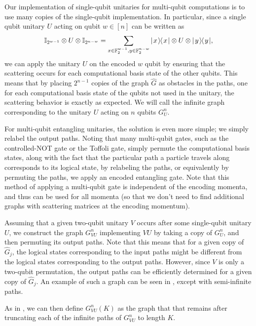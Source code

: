 \documentclass[../thesis-main/thesis-main]{subfiles}
\begin{document}
Our implementation of single-qubit unitaries for multi-qubit computations is to use many copies of the single-qubit implementation.  In particular, since a single qubit unitary $U$ acting on qubit $w\in [n]$ can be written as
\begin{align}
  \mathbb{I}_{2^{w-1}} \otimes U \otimes \mathbb{I}_{2^{n-w}} = \sum_{x \in \mathbb{F}_2^{w-1}, y\in \mathbb{F}_2^{n-w}} |\mspace{2mu} x \mspace{2mu} \rangle\mspace{-2mu}\langle\mspace{2mu} x \mspace{2mu} | \otimes U \otimes |\mspace{2mu} y \mspace{2mu} \rangle\mspace{-2mu}\langle\mspace{2mu} y \mspace{2mu} |,
\end{align}
we can apply the unitary $U$ on the encoded $w$ qubit by ensuring that the scattering occurs for each computational basis state of the other qubits.  This means that by placing $2^{n-1}$ copies of the graph $\widehat{G}$ as obstacles in the paths, one for each computational basis state of the qubits not used in the unitary, the scattering behavior is exactly as expected.  We will call the infinite graph corresponding to the unitary $U$ acting on $n$ qubits $G_U^n$.

For multi-qubit entangling unitaries, the solution is even more simple; we simply relabel the output paths.  Noting that many multi-qubit gates, such as the controlled-NOT gate or the Toffoli gate, simply permute the computational basis states, along with the fact that the particular path a particle travels along corresponds to its logical state, by relabeling the paths, or equivalently by permuting the paths, we apply an encoded entangling gate.    Note that this method of applying a multi-qubit gate is independent of the encoding momenta, and thus can be used for all momenta (so that we don't need to find additional graphs with scattering matrices at the encoding momentum).  

Assuming that a given two-qubit unitary $V$ occurs after some single-qubit unitary $U$, we construct the graph $G_{VU}^n$ implementing $VU$ by taking a copy of $G_U^n$, and then permuting its output paths.  Note that this means that for a given copy of $\widehat{G}_j$, the logical states corresponding to the input paths might be different from the logical states corresponding to the output paths.  However, since $V$ is only a two-qubit permutation, the output paths can be efficiently determined for a given copy of $\widehat{G}_j$. An example of such a graph can be seen in , except with semi-infinite paths.

As in , we can then define $G_{VU}^n(K)$ as the graph that that remains after truncating each of the infinite paths of $G_{VU}^n$ to length $K$.
\end{document}
